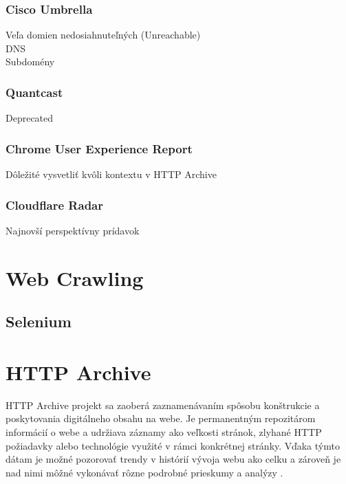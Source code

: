 \subsubsection{Cisco Umbrella}

Veľa domien nedosiahnuteľných (Unreachable)
\\
DNS
\\
Subdomény

\subsubsection{Quantcast}

Deprecated

\subsubsection{Chrome User Experience Report}

Dôležité vysvetliť kvôli kontextu v HTTP Archive

\subsubsection{Cloudflare Radar}

Najnovší perspektívny prídavok


\section{Web Crawling}
\label{web-crawling}


\subsection{Selenium}
\label{selenium}


\section{HTTP Archive}
\label{httparchive}

HTTP Archive projekt sa zaoberá zaznamenávaním spôsobu konštrukcie a poskytovania digitálneho obsahu na webe. Je permanentným repozitárom informácií o webe a udržiava záznamy ako veľkosti
stránok, zlyhané HTTP požiadavky alebo technológie využité v rámci konkrétnej stránky. Vďaka týmto dátam je možné pozorovať trendy v histórií vývoja webu ako celku a zároveň je nad nimi môžné vykonávať
rôzne podrobné prieskumy a analýzy \cite{httparchive-about}. 

